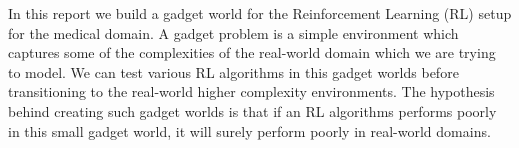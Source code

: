 In this report we build a gadget world  for the Reinforcement Learning (RL) setup for the medical domain. A gadget problem is a simple environment which captures some of the complexities of the real-world domain which we are trying  to model. We can test various RL algorithms in this gadget worlds before transitioning to the real-world higher complexity environments. The hypothesis behind creating such gadget worlds is that if an RL algorithms performs poorly in this small gadget world, it will surely perform poorly in real-world domains.